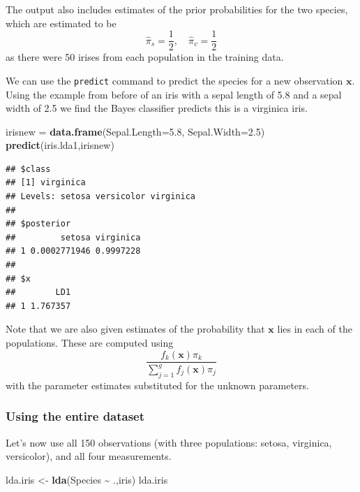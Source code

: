 \documentclass[
]{book}
\newenvironment{Shaded}{\begin{snugshade}}{\end{snugshade}}
\newcommand{\AttributeTok}[1]{\textcolor[rgb]{0.13,0.29,0.53}{#1}}
\newcommand{\FloatTok}[1]{\textcolor[rgb]{0.00,0.00,0.81}{#1}}
\newcommand{\FunctionTok}[1]{\textcolor[rgb]{0.13,0.29,0.53}{\textbf{#1}}}
\newcommand{\NormalTok}[1]{#1}
\newcommand{\OtherTok}[1]{\textcolor[rgb]{0.56,0.35,0.01}{#1}}
\newcommand{\SpecialCharTok}[1]{\textcolor[rgb]{0.81,0.36,0.00}{\textbf{#1}}}
\theoremstyle{definition}
\theoremstyle{definition}
\theoremstyle{definition}
\theoremstyle{definition}
\theoremstyle{remark}
\begin{document}
The output also includes estimates of the prior probabilities for the two species, which are estimated to be
\[\hat{\pi}_s = \frac{1}{2}, \quad \hat{\pi}_v = \frac{1}{2}\]
as there were 50 irises from each population in the training data.

We can use the \texttt{predict} command to predict the species for a new observation \(\mathbf x\). Using the example from before of an iris with a sepal length of 5.8 and a sepal width of 2.5 we find the Bayes classifier predicts this is a virginica iris.

\begin{Shaded}
\begin{Highlighting}[]
\NormalTok{irisnew }\OtherTok{=} \FunctionTok{data.frame}\NormalTok{(}\AttributeTok{Sepal.Length=}\FloatTok{5.8}\NormalTok{, }\AttributeTok{Sepal.Width=}\FloatTok{2.5}\NormalTok{)}
\FunctionTok{predict}\NormalTok{(iris.lda1,irisnew)}
\end{Highlighting}
\end{Shaded}

\begin{verbatim}
## $class
## [1] virginica
## Levels: setosa versicolor virginica
## 
## $posterior
##         setosa virginica
## 1 0.0002771946 0.9997228
## 
## $x
##        LD1
## 1 1.767357
\end{verbatim}

Note that we are also given estimates of the probability that \(\mathbf x\) lies in each of the populations. These are computed using
\[\frac{f_k(\mathbf x)\pi_k}{\sum_{j=1}^g f_j(\mathbf x)\pi_j}\]
with the parameter estimates substituted for the unknown parameters.

\subsubsection*{Using the entire dataset}\label{using-the-entire-dataset}

Let's now use all 150 observations (with three populations: setosa, virginica, versicolor), and all four measurements.

\begin{Shaded}
\begin{Highlighting}[]
\NormalTok{lda.iris }\OtherTok{\textless{}{-}} \FunctionTok{lda}\NormalTok{(Species }\SpecialCharTok{\textasciitilde{}}\NormalTok{ .,iris)}
\NormalTok{lda.iris }
\end{Highlighting}
\end{Shaded}
\end{document}
